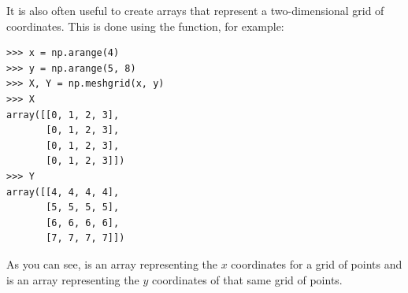 It is also often useful to create arrays that represent a two-dimensional grid of coordinates.
This is done using the  function, for example:
\begin{lstlisting}
>>> x = np.arange(4)
>>> y = np.arange(5, 8)
>>> X, Y = np.meshgrid(x, y)
>>> X
array([[0, 1, 2, 3],
       [0, 1, 2, 3],
       [0, 1, 2, 3],
       [0, 1, 2, 3]])
>>> Y
array([[4, 4, 4, 4],
       [5, 5, 5, 5],
       [6, 6, 6, 6],
       [7, 7, 7, 7]])
\end{lstlisting}
As you can see,  is an array representing the $x$ coordinates for a grid of points and  is an array representing the $y$ coordinates of that same grid of points.

